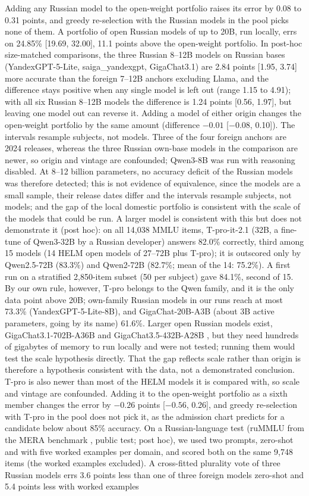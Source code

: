\documentclass[preprint,12pt,authoryear]{elsarticle}
\begin{document}
Adding any Russian model to the open-weight portfolio raises its error by 0.08 to 0.31 points, and greedy re-selection with the Russian models in the pool picks none of them. A portfolio of open Russian models of up to 20B, run locally, errs on 24.85\% [19.69, 32.00], 11.1 points above the open-weight portfolio. In post-hoc size-matched comparisons, the three Russian 8--12B models on Russian bases (YandexGPT-5-Lite, saiga\_yandexgpt, GigaChat3.1) are 2.84 points [1.95, 3.74] more accurate than the foreign 7--12B anchors excluding Llama, and the difference stays positive when any single model is left out (range 1.15 to 4.91); with all six Russian 8--12B models the difference is 1.24 points [0.56, 1.97], but leaving one model out can reverse it. Adding a model of either origin changes the open-weight portfolio by the same amount (difference $-0.01$ [$-0.08$, 0.10]). The intervals resample subjects, not models. Three of the four foreign anchors are 2024 releases, whereas the three Russian own-base models in the comparison are newer, so origin and vintage are confounded; Qwen3-8B was run with reasoning disabled. At 8--12 billion parameters, no accuracy deficit of the Russian models was therefore detected; this is not evidence of equivalence, since the models are a small sample, their release dates differ and the intervals resample subjects, not models; and the gap of the local domestic portfolio is consistent with the scale of the models that could be run. A larger model is consistent with this but does not demonstrate it (post hoc): on all 14,038 MMLU items, T-pro-it-2.1 (32B, a fine-tune of Qwen3-32B by a Russian developer) answers 82.0\% correctly, third among 15 models (14 HELM open models of 27--72B plus T-pro); it is outscored only by Qwen2.5-72B (83.3\%) and Qwen2-72B (82.7\%; mean of the 14: 75.2\%). A first run on a stratified 2,850-item subset (50 per subject) gave 84.1\%, second of 15. By our own rule, however, T-pro belongs to the Qwen family, and it is the only data point above 20B; own-family Russian models in our runs reach at most 73.3\% (YandexGPT-5-Lite-8B), and GigaChat-20B-A3B (about 3B active parameters, going by its name) 61.6\%. Larger open Russian models exist, GigaChat3.1-702B-A36B and GigaChat3.5-432B-A28B \citep{aisage2026gigachat}, but they need hundreds of gigabytes of memory to run locally and were not tested; running them would test the scale hypothesis directly. That the gap reflects scale rather than origin is therefore a hypothesis consistent with the data, not a demonstrated conclusion. T-pro is also newer than most of the HELM models it is compared with, so scale and vintage are confounded. Adding it to the open-weight portfolio as a sixth member changes the error by $-0.26$ points [$-0.56$, 0.26], and greedy re-selection with T-pro in the pool does not pick it, as the admission chart predicts for a candidate below about 85\% accuracy. On a Russian-language test (ruMMLU from the MERA benchmark \citep{fenogenova2024mera}, public test; post hoc), we used two prompts, zero-shot and with five worked examples per domain, and scored both on the same 9,748 items (the worked examples excluded). A cross-fitted plurality vote of three Russian models errs 3.6 points less than one of three foreign models zero-shot and 5.4 points less with worked examples 
\end{document}

